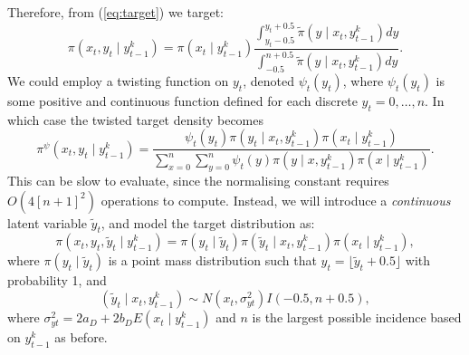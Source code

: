 \documentclass[a4paper]{article}
\begin{document}
Therefore, from (\ref{eq:target}) we target:
\begin{equation}
    \pi\left(x_t, y_t \mid y^k_{t - 1}\right) = \pi\left(x_t \mid y^k_{t - 1}\right) \frac{\int_{y_t - 0.5}^{y_t + 0.5} \tilde{\pi}\left(y \mid x_t, y^k_{t - 1}\right) dy}{\int_{-0.5}^{n + 0.5} \tilde{\pi}\left(y \mid x_t, y^k_{t - 1}\right) dy}.
\end{equation}
We could employ a twisting function on $y_t$, denoted $\psi_t\left(y_t\right)$, where $\psi_t\left(y_t\right)$ is some positive and continuous function defined for each discrete $y_t = 0, \dots, n$. In which case the twisted target density becomes
\begin{equation}
    \pi^{\psi}\left(x_t, y_t \mid y^k_{t - 1}\right) = \frac{\psi_t\left(y_t\right)\pi\left(y_t \mid x_t, y^k_{t - 1}\right)\pi\left(x_t \mid y^k_{t - 1}\right)}{\sum_{x = 0}^n \sum_{y = 0}^n \psi_t\left(y\right)\pi\left(y \mid x, y^k_{t - 1}\right)\pi\left(x \mid y^k_{t - 1}\right)}.
\end{equation}
This can be slow to evaluate, since the normalising constant requires $O(4[n + 1]^2)$ operations to compute. Instead, we will introduce a \textit{continuous} latent variable $\tilde{y}_t$, and model the target distribution as:
\begin{equation}
    \pi\left(x_t, y_t, \tilde{y}_t \mid y^k_{t - 1}\right) = \pi\left(y_t \mid \tilde{y}_t\right)\pi\left(\tilde{y}_t \mid x_t, y^k_{t - 1}\right)\pi\left(x_t \mid y^k_{t - 1}\right),\label{eq:target1}
\end{equation}
where $\pi\left(y_t \mid \tilde{y}_t\right)$ is a point mass distribution such that $y_t = \lfloor \tilde{y}_t + 0.5 \rfloor$ with probability 1, and 
\begin{equation}
     \left(\tilde{y}_t \mid x_t, y^k_{t - 1}\right) \sim N\left(x_t, \sigma^2_{yt}\right)I\left(-0.5, n + 0.5\right),
\end{equation}
where $\sigma^2_{yt} = 2 a_D + 2 b_D E\left(x_t \mid y^k_{t - 1}\right)$ and $n$ is the largest possible incidence based on $y^k_{t - 1}$ as before. 
\end{document}
